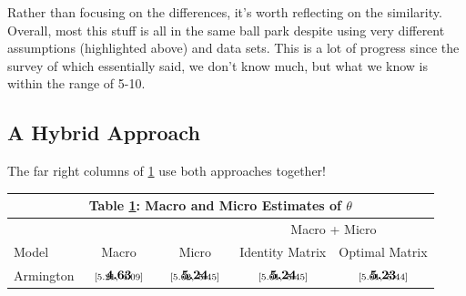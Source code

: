 \documentclass[pdftex,12pt]{article}
\renewcommand{\arraystretch}{.7}
\begin{document}
Rather than focusing on the differences, it's worth reflecting on the similarity. Overall, most this stuff is all in the same ball park despite using very different assumptions (highlighted above) and data sets. This is a lot of progress since the survey of \citet{anderson2004trade} which essentially said, we don't know much, but what we know is within the range of 5-10.

\subsection{A Hybrid Approach}

The far right columns of \ref{tb:tariff_rslts} use both approaches together!

\begin{table}[!t]
\footnotesize
{}
\renewcommand{\arraystretch}{1.85}
\setlength {\tabcolsep}{1.75mm}
\begin{center}\label{tb:tariff_rslts}
\begin{tabular}[t]{l c c c c}
\multicolumn{5}{c}{\normalsize\textbf{Table \ref{tb:tariff_rslts}: Macro and Micro Estimates of $\theta$}}
\\
\hline
\hline
&  &  & \multicolumn{2}{c}{Macro + Micro} \\
 \cmidrule(lr){4-5}
 Model &  Macro &  Micro  &  Identity  Matrix &  Optimal  Matrix \\
\hline
Armington   & $\begin{array}{c}{\textbf{4.63}} \vspace{-.4cm}\\ \scriptstyle{[5.21,   \ 4.09]}\end{array}$   & $\begin{array}{c}{\textbf{5.24}} \vspace{-.4cm}\\ \scriptstyle{[5.02,   \ 5.45]}\end{array}$  & $\begin{array}{c}{\textbf{5.24}} \vspace{-.4cm}\\ \scriptstyle{[5.01,   \ 5.45]}\end{array}$ &
$\begin{array}{c}{\textbf{5.23}} \vspace{-.4cm}\\ \scriptstyle{[5.01,   \ 5.44]}\end{array}$ \\

\end{tabular}
\end{center}
\end{table}
\end{document}
